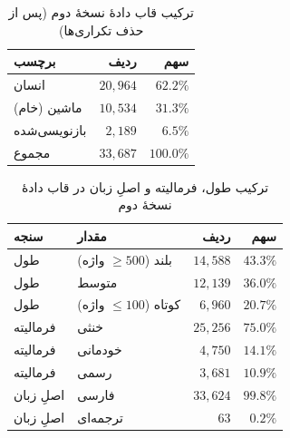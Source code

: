 \begin{table}[H]
\centering
\caption{ترکیب قاب دادهٔ نسخهٔ دوم (پس از حذف تکراری‌ها)}
\label{tab:v2-dataset}
\begin{tabular}{lrr}
\toprule
\textbf{برچسب} & \textbf{ردیف} & \textbf{سهم} \\
\midrule
انسان & $20{,}964$ & $62.2\%$ \\
ماشین (خام) & $10{,}534$ & $31.3\%$ \\
بازنویسی‌شده & $2{,}189$ & $6.5\%$ \\
مجموع & $33{,}687$ & $100.0\%$ \\
\bottomrule
\end{tabular}
\end{table}

\begin{table}[H]
\centering
\caption{ترکیب طول، فرمالیته و اصلِ زبان در قاب دادهٔ نسخهٔ دوم}
\label{tab:v2-mix}
\begin{tabular}{llrr}
\toprule
\textbf{سنجه} & \textbf{مقدار} & \textbf{ردیف} & \textbf{سهم} \\
\midrule
طول & بلند ($\ge 500$ واژه) & $14{,}588$ & $43.3\%$ \\
طول & متوسط & $12{,}139$ & $36.0\%$ \\
طول & کوتاه ($\le 100$ واژه) & $6{,}960$ & $20.7\%$ \\
فرمالیته & خنثی & $25{,}256$ & $75.0\%$ \\
فرمالیته & خودمانی & $4{,}750$ & $14.1\%$ \\
فرمالیته & رسمی & $3{,}681$ & $10.9\%$ \\
اصلِ زبان & فارسی & $33{,}624$ & $99.8\%$ \\
اصلِ زبان & ترجمه‌ای & $63$ & $0.2\%$ \\
\bottomrule
\end{tabular}
\end{table}
